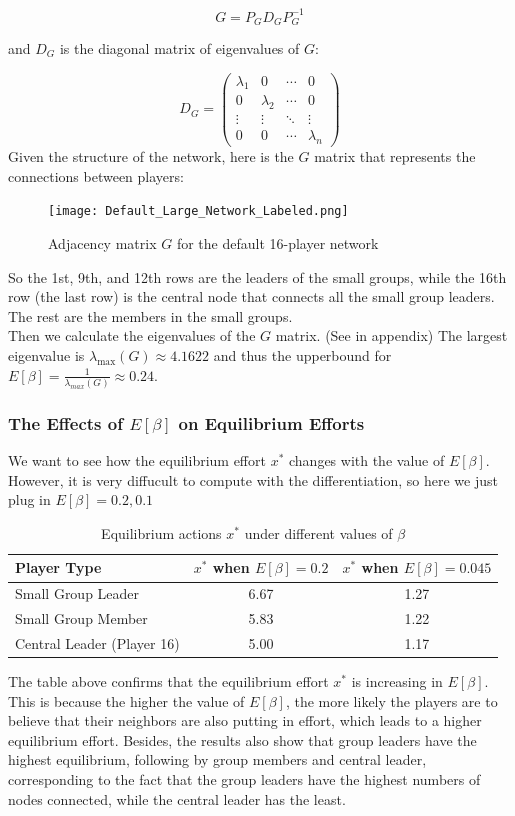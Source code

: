 \documentclass[12pt]{article}
\begin{document}
\[
G = P_G D_G P_G^{-1}
\]

and $D_G$ is the diagonal matrix of eigenvalues of $G$:

\[
D_G = 
\begin{pmatrix}
\lambda_1 & 0 & \cdots & 0 \\
0 & \lambda_2 & \cdots & 0 \\
\vdots & \vdots & \ddots & \vdots \\
0 & 0 & \cdots & \lambda_n
\end{pmatrix}
\]
Given the structure of the network, here is the $G$ matrix that represents the connections between players:
\begin{figure}[H]
  \centering
  \texttt{[image: Default\_Large\_Network\_Labeled.png]}
  \caption{Adjacency matrix $G$ for the default 16-player network}
  \label{fig:G-matrix}
\end{figure}
So the 1st, 9th, and 12th rows are the leaders of the small groups, while the 16th row (the last row) is the central node that connects all the small group leaders. The rest are the members in the small groups.\\
Then we calculate the eigenvalues of the $G$ matrix. (See in appendix) The largest eigenvalue is $\lambda_{\text{max}}(G)  \approx 4.1622$ and thus the upperbound for $E[\beta] = \frac{1}{\lambda_{max}(G)} \approx 0.24$.\\
\subsubsection*{The Effects of $E[\beta]$ on Equilibrium Efforts}
We want to see how the equilibrium effort $x^*$ changes with the value of $E[\beta]$. However, it is very diffucult to compute with the differentiation, so here we just plug in $E[\beta]=0.2,0.1$\\
\begin{table}[H]
  \centering
  \begin{tabular}{lcc}
  \toprule
  \textbf{Player Type} & \textbf{\( x^* \) when \( E[\beta] = 0.2 \)} & \textbf{\( x^* \) when \( E[\beta] = 0.045 \)} \\
  \midrule
  Small Group Leader       & 6.67 & 1.27 \\
  Small Group Member       & 5.83 & 1.22 \\
  Central Leader (Player 16) & 5.00 & 1.17 \\
  \bottomrule
  \end{tabular}
  \caption{Equilibrium actions \( x^* \) under different values of \( \beta \)}
  \label{tab:xstar-beta}
  \end{table}
The table above confirms that the equilibrium effort \( x^* \) is increasing in \( E[\beta] \). This is because the higher the value of \( E[\beta] \), the more likely the players are to believe that their neighbors are also putting in effort, which leads to a higher equilibrium effort. Besides, the results also show that group leaders have the highest equilibrium, following by group members and central leader, corresponding to the fact that the group leaders have the highest numbers of nodes connected, while the central leader has the least.\\
\end{document}
